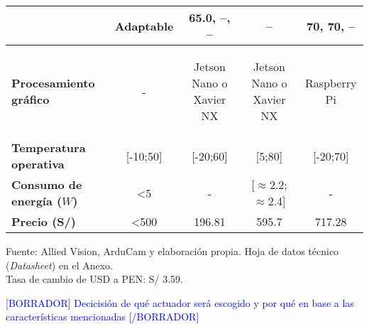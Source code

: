 \begin{itemize}
\begin{savenotes}
\begin{mytable}[H]
\begin{tabular}{l|c|c|c|c|}
{				} & Adaptable & 65.0, --, -- & -- & 70, 70, -- \\ \hline
				\multicolumn{1}{|l|}{
				\begin{minipage}{\myforthmaxsizeofcontenttable}	
					\textbf{Procesamiento gráfico}
				\end{minipage}
				} & - & 
				\begin{minipage}{\mythirdmaxsizeofcontenttable}\begin{myflushcenter}
					Jetson Nano o Xavier NX
				\end{myflushcenter}\end{minipage} & 
				\begin{minipage}{\mythirdmaxsizeofcontenttable}\begin{myflushcenter}
					Jetson Nano o Xavier NX
				\end{myflushcenter}\end{minipage}&
				\begin{minipage}{\mythirdmaxsizeofcontenttable}\begin{myflushcenter}
					Raspberry Pi
				\end{myflushcenter}\end{minipage} \\ \hline 
				\multicolumn{1}{|l|}{
				\begin{minipage}{\myforthmaxsizeofcontenttable}	
					\textbf{Temperatura operativa}
				\end{minipage}
				} & [-10;50] & [-20;60] & [5;80] & [-20;70] \\ \hline
				\multicolumn{1}{|l|}{
				\begin{minipage}{\myforthmaxsizeofcontenttable}	
					\textbf{Consumo de energía ($W$)}
				\end{minipage}
				} & <5 & - & [$\approx$2.2;$\approx$2.4] & - \\ \hline
				\multicolumn{1}{|l|}{
				\begin{minipage}{\myforthmaxsizeofcontenttable}	
					\textbf{Precio (S/)}
				\end{minipage}
				} & <500 & 196.81 & 595.7 & 717.28 \\ \hline
				\end{tabular}
			\begin{flushleft}	
				Fuente: Allied Vision, ArduCam y elaboración propia. Hoja de datos técnico (\textit{Datasheet}) en el Anexo.\\
				Tasa de cambio de USD a PEN: S/ 3.59.
			\end{flushleft}
		\end{mytable}
	\end{savenotes}
	
	\textcolor{blue}{[BORRADOR] Decicisión de qué actuador será escogido y por qué en base a las características mencionadas [/BORRADOR]}
	
	
	
\end{itemize}



